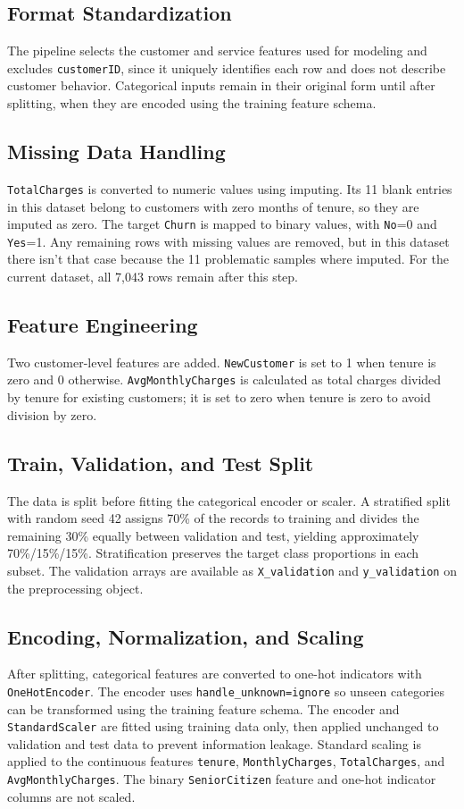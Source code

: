 \documentclass{article}
\begin{document}
\subsection{Format Standardization}
The pipeline selects the customer and service features used for modeling and excludes 
\texttt{customerID}, since it uniquely identifies each row and does not describe customer behavior. 
Categorical inputs remain in their original form until after splitting, when they are encoded using the training feature schema.

\subsection{Missing Data Handling}
\texttt{TotalCharges} is converted to numeric values using imputing. Its 11 blank entries in this dataset belong 
to customers with zero months of tenure, so they are imputed as zero. 
The target \texttt{Churn} is mapped to binary values, with \texttt{No}=0 and \texttt{Yes}=1. 
Any remaining rows with missing values are removed, but in this dataset there isn't that case because the 11 problematic samples where imputed. 
For the current dataset, all 7,043 rows remain after this step.

\subsection{Feature Engineering}
Two customer-level features are added. 
\texttt{NewCustomer} is set to 1 when tenure is zero and 0 otherwise.
\texttt{AvgMonthlyCharges} is calculated as total charges divided by tenure for existing customers; it is set to zero when tenure is zero to avoid division by zero.

\subsection{Train, Validation, and Test Split}
The data is split before fitting the categorical encoder or scaler. A stratified split with random seed 42 assigns 70\% of the records to training and divides the remaining 30\% equally between validation and test, yielding approximately 70\%/15\%/15\%. Stratification preserves the target class proportions in each subset. The validation arrays are available as \texttt{X\_validation} and \texttt{y\_validation} on the preprocessing object.

\subsection{Encoding, Normalization, and Scaling}
After splitting, categorical features are converted to one-hot indicators with \texttt{OneHotEncoder}. The encoder uses \texttt{handle\_unknown=ignore} so unseen categories can be transformed using the training feature schema. The encoder and \texttt{StandardScaler} are fitted using training data only, then applied unchanged to validation and test data to prevent information leakage. Standard scaling is applied to the continuous features \texttt{tenure}, \texttt{MonthlyCharges}, \texttt{TotalCharges}, and \texttt{AvgMonthlyCharges}. The binary \texttt{SeniorCitizen} feature and one-hot indicator columns are not scaled.
\end{document}
